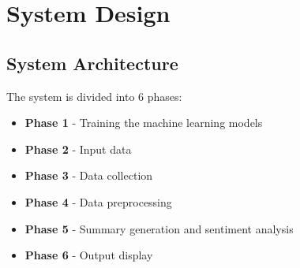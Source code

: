 \documentclass[11pt]{report}
\begin{document}
\chapter{System Design}
\section{System Architecture} 
The system is divided into 6 phases: \\
\begin{itemize}
    \item \textbf{Phase 1} - Training the machine learning models \\
    \item \textbf{Phase 2} - Input data \\
    \item \textbf{Phase 3} - Data collection \\
    \item \textbf{Phase 4} - Data preprocessing \\
    \item \textbf{Phase 5} - Summary generation and sentiment analysis \\
    \item \textbf{Phase 6} - Output display \\
\end{itemize}
\end{document}
